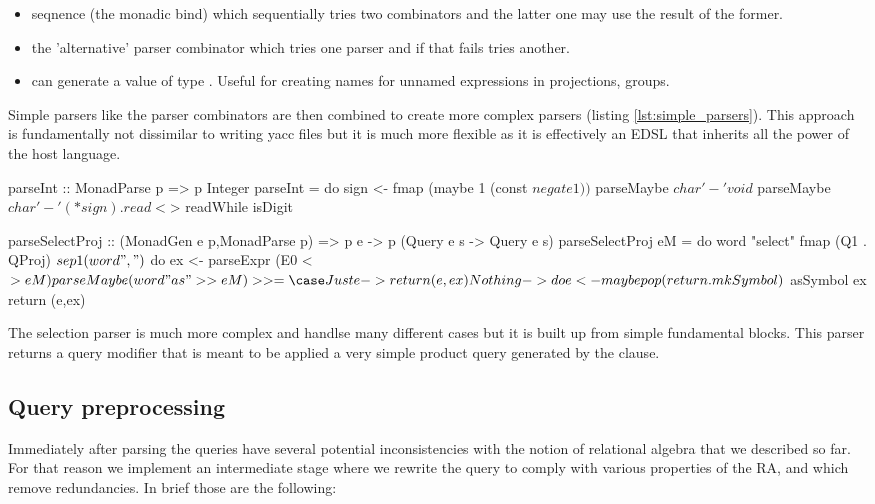 \begin{itemize}
\item seqnence (the monadic bind)  which sequentially tries two combinators and the latter one may
  use the result of the former.
\item the 'alternative' parser combinator  which tries one parser and if that fails tries another.
\item {} can generate a value of type . Useful for creating names for unnamed expressions in
  projections, groups.
\end{itemize}

Simple parsers like the  parser combinators are then
combined to create more complex parsers (listing
\ref{lst:simple_parsers}). This approach is fundamentally not
dissimilar to writing yacc files but it is much more flexible as it is
effectively an EDSL that inherits all the power of the host language.

\begin{code}
  \begin{haskellcode}
    parseInt :: MonadParse p => p Integer
    parseInt = do
      sign <- fmap (maybe 1 (const $ negate 1)) $ parseMaybe $ char '-'
      void $ parseMaybe $ char '-'
      (* sign) . read <$> readWhile isDigit

    parseSelectProj
      :: (MonadGen e p,MonadParse p)
      => p e -> p (Query e s -> Query e s)
    parseSelectProj eM = do
      word "select"
      fmap (Q1 . QProj) $ sep1 (word ",") $ do
      ex <- parseExpr (E0 <$> eM)
      parseMaybe (word "as" >> eM) >>= \case
        Just e -> return (e,ex)
        Nothing -> do
      e <- maybe pop (return . mkSymbol) $ asSymbol ex
      return (e,ex)
  \end{haskellcode}
  \caption{\label{lst:simple_parse}The selection parser is much more complex
    and handlse many different cases but it is built up from simple
    fundamental blocks. This parser returns a query modifier that is
    meant to be applied a very simple product query generated by the
     clause.}
\end{code}

\subsection{Query preprocessing}

Immediately after parsing the queries have several potential
inconsistencies with the notion of relational algebra that we
described so far. For that reason we implement an intermediate stage
where we rewrite the query to comply with various properties of the
RA, and which remove redundancies. In brief those are the following:

